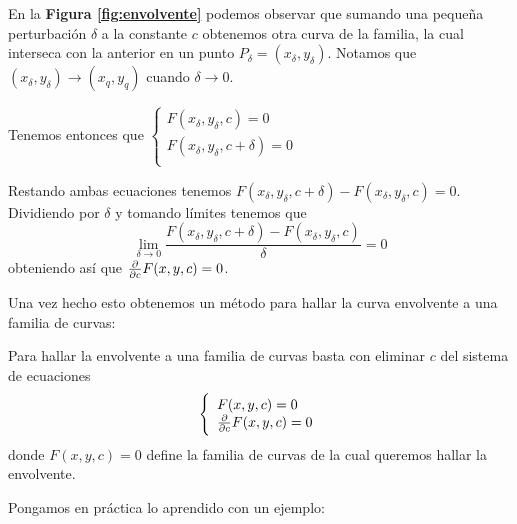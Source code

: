 \documentclass{mathnotes}
\begin{document}
En la \textbf{Figura \ref{fig:envolvente}} podemos observar que sumando una pequeña perturbación $\delta$ a la constante $c$ obtenemos otra curva de la familia, la cual interseca con la anterior en un punto $P_\delta = (x_\delta, y_\delta)$. Notamos que $(x_\delta, y_\delta) \to (x_q, y_q)$ cuando $\delta \to 0$.

Tenemos entonces que 
$
  \left\lbrace
  \begin{array}{l}
     F(x_\delta, y_\delta, c) = 0 \\
     F(x_\delta, y_\delta, c+\delta) = 0  \\
  \end{array}
  \right.
$

Restando ambas ecuaciones tenemos $F(x_\delta, y_\delta, c+\delta) - F(x_\delta, y_\delta, c) = 0$. Dividiendo por $\delta$ y tomando límites tenemos que $$\lim_{\delta\to 0} \frac{F(x_\delta, y_\delta, c+\delta) - F(x_\delta, y_\delta, c)}{\delta}=0$$ obteniendo así que $\frac{\partial}{\partial c}F(x,y,c) = 0$.

Una vez hecho esto obtenemos un método para hallar la curva envolvente a una familia de curvas:

\begin{method}
Para hallar la envolvente a una familia de curvas basta con eliminar $c$ del sistema de ecuaciones
$$  
  \left\lbrace
  \begin{array}{l}
     F(x, y, c) = 0 \\
     \frac{\partial}{\partial c}F(x, y, c) = 0  \\
  \end{array}
  \right.
$$
donde $F(x,y,c) = 0$ define la familia de curvas de la cual queremos hallar la envolvente.
\end{method}

Pongamos en práctica lo aprendido con un ejemplo:

\end{document}
